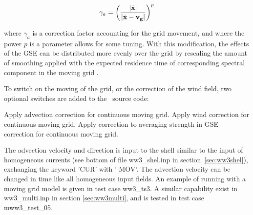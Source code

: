 \begin{equation}
\gamma_a = \left ( \frac{|\dot{\bf{x}}|}{|\dot{\bf{x}}-\bf{v}_g|}
\right ) ^{p}
\label{eq:move_GSE_avg2}
\end{equation}

\noindent
where $\gamma_a$ is a correction factor accounting for the grid movement, and
where the power $p$ is a parameter allows for some tuning. With this
modification, the effects of the GSE can be distributed more evenly over the
grid by rescaling the amount of smoothing applied with the expected residence
time of corresponding spectral component in the moving grid
\citep[see][]{tol:OMOD05b}.

\vspace{\baselineskip} 
\vspace{\baselineskip} 

\noindent
To switch on the moving of the grid, or the correction of the wind field, two
optional switches are added to the \ws\ source code:

\begin{slist}
 {Apply advection correction for continuous moving grid.}
 {Apply wind correction for continuous moving grid.}
 {Apply correction to averaging strength in GSE correction for
           continuous moving grid.}
\end{slist}

\noindent
The advection velocity and direction is input to the shell similar to the
input of homogeneous currents (see bottom of file {\file ww3\_shel.inp} in
section~\ref{sec:ww3shel}), exchanging the keyword '{\code CUR}' with '{\code
  MOV}'. The advection velocity can be changed in time like all homogeneous
input fields. An example of running with a moving grid model is given in test
case {\file ww3\_ts3}. A similar capability exist in {\file ww3\_multi.inp} in
section \ref{sec:ww3multi}, and is tested in test case {\file mww3\_test\_05}.
